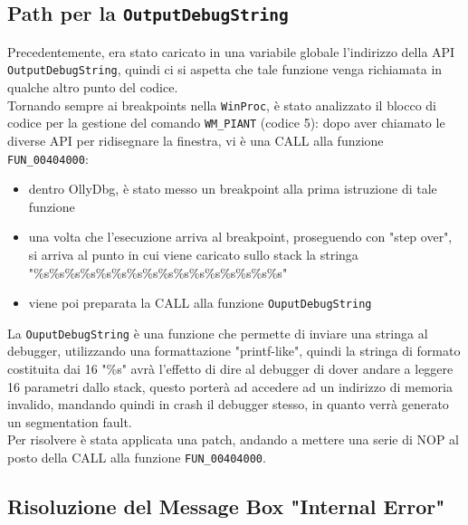 \documentclass{article}
\begin{document}
\subsection{Path per la \texttt{OutputDebugString}}
Precedentemente, era stato caricato in una variabile globale l'indirizzo della API \texttt{OutputDebugString}, quindi ci si aspetta che tale funzione venga richiamata in qualche altro punto del codice.\\Tornando sempre ai breakpoints nella \texttt{WinProc}, è stato analizzato il blocco di codice per la gestione del comando \texttt{WM\_PIANT} (codice 5): dopo aver chiamato le diverse API per ridisegnare la finestra, vi è una CALL alla funzione \texttt{FUN\_00404000}:
\begin{itemize}
\item dentro OllyDbg, è stato messo un breakpoint alla prima istruzione di tale funzione
\item una volta che l'esecuzione arriva al breakpoint, proseguendo con "step over", si arriva al punto in cui viene caricato sullo stack la stringa "\%s\%s\%s\%s\%s\%s\%s\%s\%s\%s\%s\%s\%s\%s\%s\%s"
\item viene poi preparata la CALL alla funzione \texttt{OuputDebugString}
\end{itemize}
La \texttt{OuputDebugString} è una funzione che permette di inviare una stringa al debugger, utilizzando una formattazione "printf-like", quindi la stringa di formato costituita dai 16 "\%s" avrà l'effetto di dire al debugger di dover andare a leggere 16 parametri dallo stack, questo porterà ad accedere ad un indirizzo di memoria invalido, mandando quindi in crash il debugger stesso, in quanto verrà generato un segmentation fault.\\Per risolvere è stata applicata una patch, andando a mettere una serie di NOP al posto della CALL alla funzione \texttt{FUN\_00404000}.\\
\subsection{Risoluzione del Message Box "Internal Error"}
\end{document}
